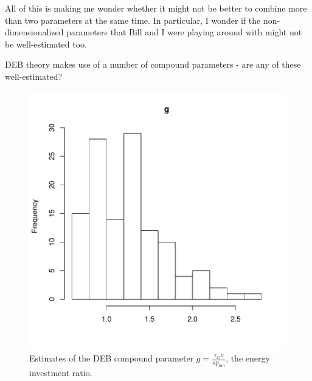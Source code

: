 \documentclass[12pt,reqno,final]{amsart}
\theoremstyle{plain}
\numberwithin{equation}{part}
\begin{document}
All of this is making me wonder whether it might not be better to
combine more than two parameters at the same time. In particular, I
wonder if the non-dimensionalized parameters that Bill and I were
playing around with might not be well-estimated too.

DEB theory makes use of a number of compound parameters - are any of
these well-estimated?

\begin{figure}
\includegraphics{Solving_the_problem_of_parameter_covariation_2-008}
\caption{Estimates of the DEB compound parameter $g =
  \frac{\epsilon_G \nu}{\kappa p_{am}}$, the energy investment
  ratio.}
\end{figure}
\end{document}
